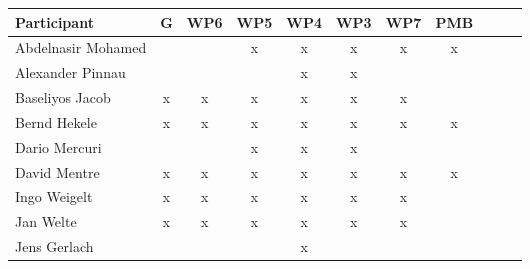 \documentclass[a4paper, 11pt]{article}
\begin{document}
\begin{tabular}{|l|c|c|c|c|c|c|c|c|c|c|}
\hline
\textbf{Participant}  & \textbf{G} & \textbf{WP6} &  \textbf{WP5} & \textbf{WP4}&  \textbf{WP3} & \textbf{WP7}&  \textbf{PMB} \\\hline
Abdelnasir Mohamed    &  &   & x & x  & x &x  &x  \\\hline 
Alexander Pinnau      &   &   &   & x & x &  &  \\\hline  
Baseliyos Jacob       & x & x & x & x & x & x &  \\\hline 
Bernd Hekele          & x & x & x & x & x & x & x \\\hline
Dario Mercuri         &   &   & x & x & x &  &   \\\hline
David Mentre          & x & x & x & x & x & x & x \\\hline
Ingo Weigelt          & x & x & x & x & x & x &   \\\hline
Jan Welte             & x & x & x & x & x & x &   \\\hline
Jens Gerlach          &   &   &   & x &  &  &   \\\hline

\end{tabular}
\end{document}
